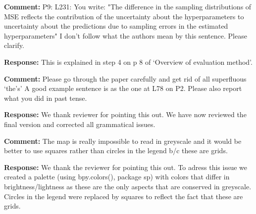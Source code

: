 \documentclass{letter}
\begin{document}
\begin{letter}
\textbf{Comment:} 
P9: L231: You write: "The difference in the sampling distributions of MSE reflects the contribution of the uncertainty about the hyperparameters to uncertainty about the predictions due to sampling errors in the estimated hyperparameters" I don't follow what the authors mean by this sentence. Please clarify. 

\textbf{Response:}
This is explained in step 4 on p 8 of `Overview of evaluation method'.

\textbf{Comment:} 
Please go through the paper carefully and get rid of all superfluous `the's' A good example sentence is as the one at L78 on P2.  Please also report what you did in past tense. 

\textbf{Response:}
We thank reviewer for pointing this out. We have now reviewed the final version and corrected all grammatical issues. 

\textbf{Comment:} 
The map is really impossible to read in greyscale and it would be better to use squares rather than circles in the legend b/c these are grids.
 
\textbf{Response:}
We thank the reviewer for pointing this out. To adress this issue we created a palette (using bpy.colors(), package sp) with colors that differ in brightness/lightness as these are the only aspects that are conserved in greyscale. Circles in the legend were replaced by squares to reflect the fact that these are grids.

\end{letter}
\end{document}
